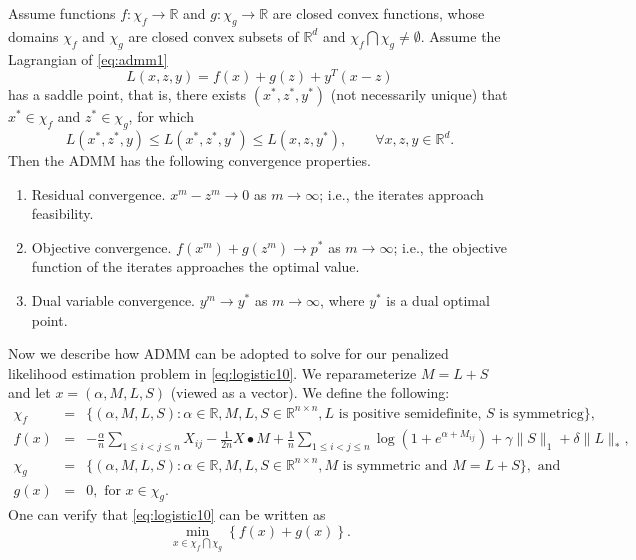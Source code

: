 \documentclass[AMS,STIX1COL]{WileyNJD-v2}
\begin{document}
{\begin{theorem}[Boyd et al., 2011]
Assume functions $f: \chi_f \to \mathbb{R}$ and
$g: \chi_g \to \mathbb{R}$ are
closed convex functions, whose domains $\chi_f$ and $\chi_g$
are closed convex subsets of $\mathbb{R}^d$ and
$\chi_f \bigcap \chi_g \neq \emptyset$.
Assume the Lagrangian of \eqref{eq:admm1}
$$
L(x,z,y) = f(x) + g(z) + y^T(x-z)
$$
has a saddle point, that is, there exists $(x^\ast, z^\ast, y^\ast)$ (not necessarily unique) that $x^\ast \in \chi_f$ and
$z^\ast \in \chi_g$, for which
$$
L(x^\ast, z^\ast, y) \le L(x^\ast, z^\ast, y^\ast) \le
L(x, z, y^\ast), \qquad \forall x, z, y \in \mathbb{R}^d.
$$
Then the ADMM has the following convergence properties.
\begin{enumerate}
\item Residual convergence. $x^m - z^m \to 0$
as $m \to \infty$; i.e., the iterates approach feasibility.

\item Objective convergence. $f(x^m) + g(z^m) \to p^\ast$ as $m \to \infty$; i.e., the objective function of
the iterates approaches the optimal value.

\item Dual variable convergence. $y^m \to y^\ast$ as $m \to \infty$, where $y^\ast$ is a dual optimal point.

\end{enumerate}
\end{theorem}

Now we describe how ADMM can be adopted to solve for our penalized likelihood estimation problem in \eqref{eq:logistic10}.
We reparameterize $M = L + S$ and let $x = (\alpha, M, L, S)$ (viewed as a vector).
We define the following:
\begin{eqnarray*}
\chi_f &=& \{ (\alpha, M, L, S): \alpha\in\mathbb{R}, M, L, S \in \mathbb{R}^{n \times n},
L \mbox{ is positive semidefinite, }
S \mbox{ is symmetricg} \}, \\
f(x) &=&
-\frac{\alpha}{n} \sum_{1\le i< j\le n}X_{ij}
-\frac{1}{2n} X \bullet M %
+ \frac{1}{n}
\sum_{1\le i<j\le n} \log \left(1 + e^{\alpha + M_{ij}}\right)
+ \gamma \|S\|_1
+ \delta \|L\|_\ast, \\
\chi_g &=& \{ (\alpha, M, L, S): \alpha\in\mathbb{R}, M, L, S \in \mathbb{R}^{n \times n},
M \mbox{ is symmetric and } M=L+S \}, \mbox{ and }\\
g(x) &=& 0, \mbox{ for } x \in \chi_g.
\end{eqnarray*}
One can verify that \eqref{eq:logistic10} can be written as
$$
\min_{x \in \chi_f \bigcap \chi_g} \left\{f(x) + g(x) \right\}.
$$


}
\end{document}
